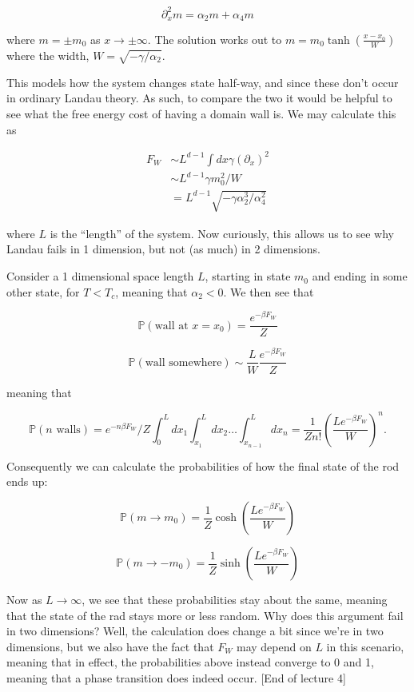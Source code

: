 \documentclass{article}
\theoremstyle{definition}
\begin{document}
$$ \partial_x^2 m = \alpha_2 m + \alpha_4 m $$ 

where $m = \pm m_0$ as $x \to \pm \infty$. The solution works out to $m = m_0
\tanh(\frac{x - x_0}{W})$ where the width, $W = \sqrt{-\gamma / \alpha_2}$.

This models how the system changes state half-way, and since these don't occur
in ordinary Landau theory. As such, to compare the two it would be helpful to
see what the free energy cost of having a domain wall is. We may calculate this
as

\begin{align*}
  F_W
  &\sim L^{d - 1} \int dx \gamma(\partial_x)^2 \\
  &\sim L^{d - 1} \gamma m_0^2 / W \\
  &= L^{d - 1} \sqrt{-\gamma \alpha_2^3 / \alpha_4^2}
\end{align*}

where $L$ is the ``length'' of the system. Now curiously, this allows us to see
why Landau fails in 1 dimension, but not (as much) in 2 dimensions.

Consider a 1 dimensional space length $L$, starting in state $m_0$ and ending in
some other state, for $T < T_c$, meaning that $\alpha_2 < 0$. We then see that

$$ \mathbb{P}(\text{wall at } x = x_0) = \frac{e^{-\beta F_W}}{Z} $$

$$ \mathbb{P}(\text{wall somewhere}) \sim \frac{L}{W} \frac{e^{-\beta
    F_W}}{Z} $$

meaning that

$$ \mathbb{P}(n \text{ walls}) = e^{-n\beta F_W} / Z \int_0^L dx_1 \int_{x_1}^L
dx_2 \dots \int_{x_{n - 1}}^L dx_n = \frac{1}{Z n!} \left( \frac{L e^{-\beta
      F_W}}{W} \right)^n. $$

Consequently we can calculate the probabilities of how the final state of the
rod ends up:

$$ \mathbb{P}(m \to m_0) = \frac{1}{Z} \cosh \left( \frac{Le^{-\beta F_W}}{W}
\right) $$

$$ \mathbb{P}(m \to -m_0) = \frac{1}{Z} \sinh \left( \frac{Le^{-\beta F_W}}{W}
\right) $$

Now as $L \to \infty$, we see that these probabilities stay about the same,
meaning that the state of the rad stays more or less random. Why does this
argument fail in two dimensions? Well, the calculation does change a bit since
we're in two dimensions, but we also have the fact that $F_W$ may depend on $L$
in this scenario, meaning that in effect, the probabilities above instead
converge to 0 and 1, meaning that a phase transition does indeed occur. [End of
lecture 4]
\end{document}
